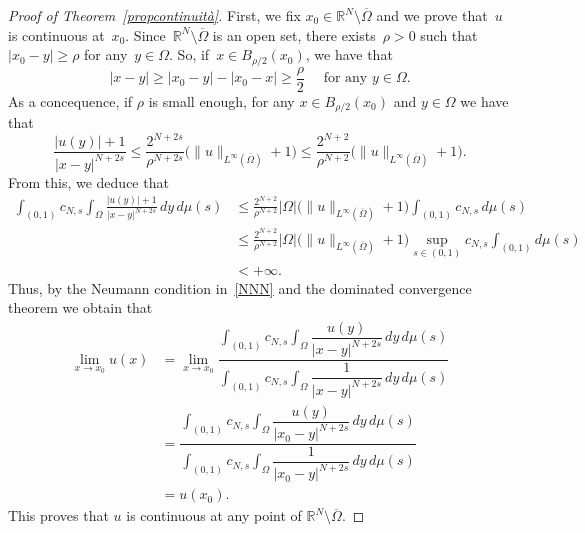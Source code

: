 \documentclass[10pt,a4paper]{amsart}
\def \R {\mathbb{R}}
\renewcommand{\geq}{\geqslant}
\renewcommand{\le}{\leqslant}
\renewcommand{\leq}{\leqslant}
\begin{document}
\begin{proof}[Proof of Theorem~\ref{propcontinuità}]
First, we fix $x_0\in \R^N\setminus \overline{\Omega}$ and we 
prove that~$u$ is continuous at~$x_0$. Since~$\R^N\setminus \overline{\Omega}$ is an open set, there exists~$\rho>0$ such that~$|x_0-y|\geq \rho$ for any~$y\in \Omega$.
So, if~$x\in B_{\rho/2}(x_0)$, we have that
\[
|x-y|\geq |x_0-y|-|x_0-x|\geq \frac{\rho}{2}\quad\mbox{ for any } y\in\Omega.
\]
As a concequence, if $\rho$ is small enough,
for any $x\in B_{\rho/2}(x_0)$ and $y\in \Omega$
we have that 
\[
\frac{|u(y)|+1}{|x-y|^{N+2s}}
\leq \frac{2^{N+2s}}{\rho^{N+2s}}\Big(\|u\|_{L^\infty(\overline{\Omega})}+1\Big)
\leq \frac{2^{N+2}}{\rho^{N+2}}\Big(\|u\|_{L^\infty(\overline{\Omega})}+1\Big).
\]
{F}rom this, we deduce that 
\[
\begin{split}
\int_{(0,1)}c_{N,s}\int_\Omega \frac{|u(y)|+1}{|x-y|^{N+2s}}\,dy\,d\mu(s)
&\leq \frac{2^{N+2}}{\rho^{N+2}}|\Omega|\Big(\|u\|_{L^\infty(\overline{\Omega})}+1\Big)\int_{(0,1)}c_{N,s}\,d\mu(s)\\
&\le\frac{2^{N+2}}{\rho^{N+2}}|\Omega|\Big(\|u\|_{L^\infty(\overline{\Omega})}+1\Big) \sup_{s\in (0, 1)} c_{N, s} \int_{(0, 1)} d\mu(s)\\
&<+\infty.
\end{split}
\]
Thus, by the Neumann condition in~\eqref{NNN} and the dominated convergence theorem we obtain that
\[
\begin{split}
\lim_{x\to x_0}u(x) &=
\lim_{x\to x_0} \dfrac{\displaystyle \int_{(0,1)}c_{N,s}\int_\Omega \dfrac{u(y)}{|x-y|^{N+2s}}\,dy\,d\mu(s)}{\displaystyle\int_{(0,1)}c_{N,s}\int_\Omega \dfrac{1}{|x-y|^{N+2s}}\,dy\,d\mu(s)}\\
&=\dfrac{\displaystyle \int_{(0,1)}c_{N,s}\int_\Omega \dfrac{u(y)}{|x_0-y|^{N+2s}}\,dy\,d\mu(s)}{\displaystyle\int_{(0,1)}c_{N,s}\int_\Omega \dfrac{1}{|x_0-y|^{N+2s}}\,dy\,d\mu(s)}\\
&=u(x_0).
\end{split}
\]
This proves that $u$ is continuous at any point of 
$\R^N\setminus \overline{\Omega}$.


\end{proof}
\end{document}
